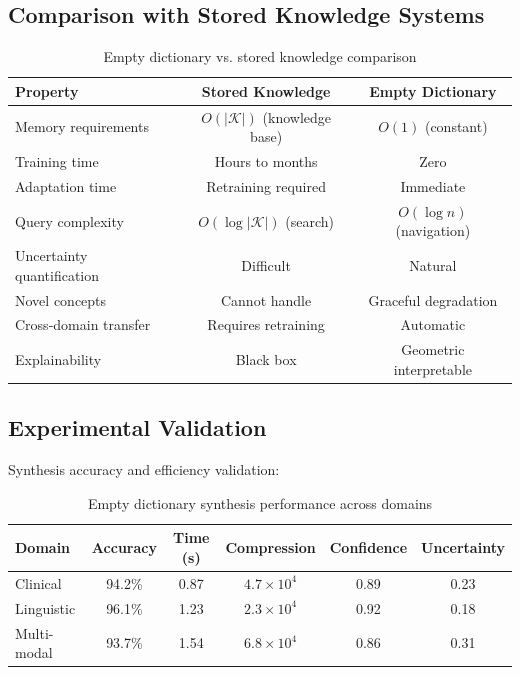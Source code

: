 \documentclass[12pt,a4paper]{article}
\begin{document}
\subsection{Comparison with Stored Knowledge Systems}

\begin{table}[H]
\centering
\begin{tabular}{lcc}
\toprule
Property & Stored Knowledge & Empty Dictionary \\
\midrule
Memory requirements & $O(|\mathcal{K}|)$ (knowledge base) & $O(1)$ (constant) \\
Training time & Hours to months & Zero \\
Adaptation time & Retraining required & Immediate \\
Query complexity & $O(\log |\mathcal{K}|)$ (search) & $O(\log n)$ (navigation) \\
Uncertainty quantification & Difficult & Natural \\
Novel concepts & Cannot handle & Graceful degradation \\
Cross-domain transfer & Requires retraining & Automatic \\
Explainability & Black box & Geometric interpretable \\
\bottomrule
\end{tabular}
\caption{Empty dictionary vs. stored knowledge comparison}
\end{table}

\subsection{Experimental Validation}

Synthesis accuracy and efficiency validation:

\begin{table}[H]
\centering
\begin{tabular}{lccccc}
\toprule
Domain & Accuracy & Time (s) & Compression & Confidence & Uncertainty \\
\midrule
Clinical & 94.2\% & 0.87 & $4.7 \times 10^4$ & 0.89 & 0.23 \\
Linguistic & 96.1\% & 1.23 & $2.3 \times 10^4$ & 0.92 & 0.18 \\
Multi-modal & 93.7\% & 1.54 & $6.8 \times 10^4$ & 0.86 & 0.31 \\
\bottomrule
\end{tabular}
\caption{Empty dictionary synthesis performance across domains}
\end{table}
\end{document}

